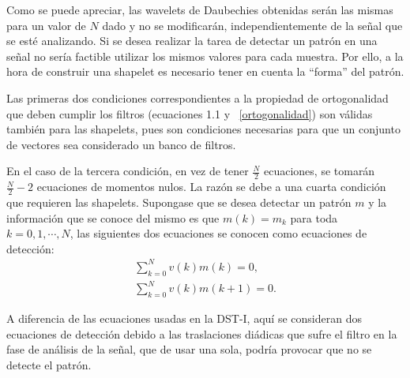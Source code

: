 \par Como se puede apreciar, las wavelets de Daubechies obtenidas ser\'an las mismas para un valor de $N$ dado y no se modificar\'an, independientemente de la se\~nal que se est\'e analizando. Si se desea realizar la tarea de detectar un patr\'on en una se\~nal no ser\'ia factible utilizar los mismos valores para cada muestra. Por ello, a la hora de construir una shapelet es necesario tener en cuenta la ``forma'' del patr\'on.

\par Las primeras dos condiciones correspondientes a la propiedad de ortogonalidad que deben cumplir los filtros (ecuaciones 1.1 y ~\ref{ortogonalidad}) son v\'alidas tambi\'en para las shapelets, pues son condiciones necesarias para que un conjunto de vectores sea considerado un banco de filtros.

\par En el caso de la tercera condici\'on, en vez de tener $\frac{N}{2}$ ecuaciones, se tomar\'an $\frac{N}{2}-2$ ecuaciones de momentos nulos. La raz\'on se debe a una cuarta condici\'on que requieren las shapelets. Supongase que se desea detectar un patr\'on $m$ y la informaci\'on que se conoce del mismo es que $m(k)=m_k$ para toda $k=0,1,\cdots,N$, las siguientes dos ecuaciones se conocen como ecuaciones de detecci\'on:
\begin{eqnarray}
\sum_{k=0}^{N}v(k)m(k)=0,
\label{matching1}\\
\sum_{k=0}^{N}v(k)m(k+1)=0.
\label{matching2}
\end{eqnarray}

\par A diferencia de las ecuaciones usadas en la DST-I, aqu\'i se consideran dos ecuaciones de detecci\'on debido a las traslaciones di\'adicas que sufre el filtro en la fase de an\'alisis de la se\~nal, que de usar una sola, podr\'ia provocar que no se detecte el patr\'on.\\

